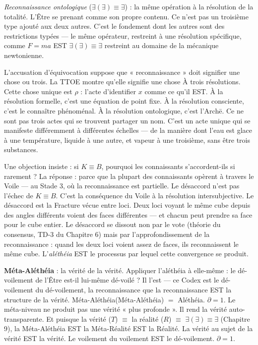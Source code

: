 \documentclass[10pt, openany, oneside]{book}
\begin{document}
\textit{Reconnaissance ontologique} ($\exists(\exists) \equiv \exists$) : la même opération à la résolution de la totalité. L'Être se prenant comme son propre contenu. Ce n'est pas un troisième type ajouté aux deux autres. C'est le fondement dont les autres sont des restrictions typées --- le même opérateur, restreint à une résolution spécifique, comme $F = ma$ EST $\exists(\exists) \equiv \exists$ restreint au domaine de la mécanique newtonienne.

L'accusation d'équivocation suppose que « reconnaissance » doit signifier une chose ou trois. La TTOE montre qu'elle signifie une chose À trois résolutions. Cette chose unique est $\rho$ : l'acte d'identifier $x$ comme ce qu'il EST. À la résolution formelle, c'est une équation de point fixe. À la résolution consciente, c'est le connaître phénoménal. À la résolution ontologique, c'est l'Arch\={e}. Ce ne sont pas trois actes qui se trouvent partager un nom. C'est un acte unique qui se manifeste différemment à différentes échelles --- de la manière dont l'eau est glace à une température, liquide à une autre, et vapeur à une troisième, sans être trois substances.

Une objection insiste : si $K \equiv B$, pourquoi les connaissants s'accordent-ils si rarement ? La réponse : parce que la plupart des connaissants opèrent à travers le Voile --- au Stade 3, où la reconnaissance est partielle. Le désaccord n'est pas l'échec de $K \equiv B$. C'est la conséquence du Voile à la résolution intersubjective. Le désaccord est la Fracture vécue entre loci. Deux loci voyant le même cube depuis des angles différents voient des faces différentes --- et chacun peut prendre sa face pour le cube entier. Le désaccord se dissout non par le vote (théorie du consensus, TD-3 du Chapitre 6) mais par l'approfondissement de la reconnaissance : quand les deux loci voient assez de faces, ils reconnaissent le même cube. L'\textit{aléthéia} EST le processus par lequel cette convergence se produit.

\textbf{Méta-Aléthéia} : la vérité de la vérité. Appliquer l'aléthéia à elle-même : le dé-voilement de l'Être est-il lui-même dé-voilé ? Il l'est --- ce Codex est le dé-voilement du dé-voilement, la reconnaissance que la reconnaissance EST la structure de la vérité. Méta-Aléthéia(Méta-Aléthéia) $=$ Aléthéia. $\partial = 1$. Le méta-niveau ne produit pas une vérité « plus profonde ». Il rend la vérité auto-transparente. Et puisque la vérité ($T$) $\equiv$ la réalité ($R$) $\equiv$ $\exists(\exists) \equiv \exists$ (Chapitre 9), la Méta-Aléthéia EST la Méta-Réalité EST la Réalité. La vérité au sujet de la vérité EST la vérité. Le voilement du voilement EST le dé-voilement. $\partial = 1$.
\end{document}
